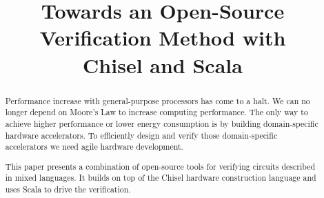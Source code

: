 \documentclass[conference]{IEEEtran}
\begin{document}

\title{Towards an Open-Source Verification Method with\\
Chisel and Scala}

\author{
\and
{}
}



\maketitle \thispagestyle{empty}

\begin{abstract}
Performance increase with general-purpose processors has come to a halt.
We can no longer depend on Moore's Law to increase computing performance.
The only way to achieve higher performance or lower energy consumption
is by building domain-specific hardware accelerators.
To efficiently design and verify those domain-specific accelerators we need
agile hardware development.

This paper presents a combination of open-source tools for verifying
circuits described in mixed languages. It builds on top of the Chisel
hardware construction language and uses Scala to drive the verification.
\end{abstract}
\end{document}

